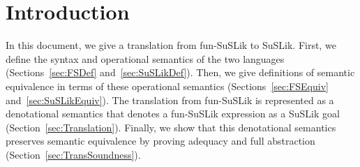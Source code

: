 \documentclass[10pt]{article}
\begin{document}
\section{Introduction}

In this document, we give a translation from fun-SuSLik to SuSLik. First, we define the syntax and
operational semantics of the two languages (Sections~\ref{sec:FSDef} and~\ref{sec:SuSLikDef}).
Then, we give definitions of semantic equivalence in terms of these
operational semantics (Sections~\ref{sec:FSEquiv} and~\ref{sec:SuSLikEquiv}). The translation from fun-SuSLik is represented as a denotational semantics
that denotes a fun-SuSLik expression as a SuSLik goal (Section~\ref{sec:Translation}). Finally, we show that this denotational
semantics preserves semantic equivalence by proving adequacy and full abstraction (Section~\ref{sec:TransSoundness}).
\\


%
%
%
%
%
%
%
\end{document}
